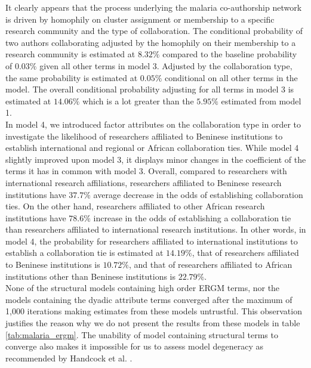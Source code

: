 It clearly appears that the process underlying the malaria co-authorship network is driven by homophily on cluster assignment or membership to a specific research community and the type of collaboration. The conditional probability of two authors collaborating adjusted by the homophily on their membership to a research community is estimated at $8.32\%$ compared to the baseline probability of $0.03\%$ given all other terms in model 3. Adjusted by the collaboration type, the same probability is estimated at $0.05\%$ conditional on all other terms in the model. The overall conditional probability adjusting for all terms in model 3 is estimated at $14.06\%$ which is a lot greater than the $5.95\%$ estimated from model 1.\\
In model 4, we introduced  factor attributes on the collaboration type in order to investigate the likelihood of researchers affiliated to Beninese institutions to establish international and regional or African collaboration ties. While model 4 slightly improved upon model 3, it displays minor changes in the coefficient of the terms it has in common with model 3. Overall, compared to researchers with international research affiliations, researchers affiliated to Beninese research institutions have $37.7\%$ average decrease in the odds of establishing collaboration ties. On the other hand, researchers affiliated to other African research institutions have $78.6\%$ increase in the odds of establishing a collaboration tie than researchers affiliated to international research institutions. In other words, in model 4, the probability for researchers affiliated to international institutions to establish a collaboration tie is estimated at $14.19\%$, that of researchers affiliated to Beninese institutions is $10.72\%$, and that of researchers affiliated to African institutions other than Beninese institutions is $22.79\%$. \\
None of the structural models containing high order ERGM terms, nor the models containing the dyadic attribute terms converged after the maximum of 1,000 iterations making estimates from these models untrustful. This observation justifies the reason why we do not present the results from these models in table \ref{tab:malaria_ergm}. The unability of model containing structural terms to converge also makes it impossible for us to assess model degeneracy as recommended by Handcock et al. \cite{handcock_assessing_2003}.

